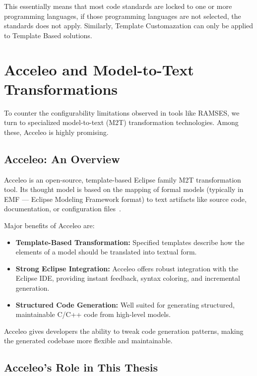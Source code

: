 This essentially means that most code standards are locked to one or more programming languages, if those programming languages are not selected, the standards does not apply. Similarly, Template Customazation can only be applied to Template Based solutions.

\section{Acceleo and Model-to-Text Transformations} \label{sec:folders_and_files}

To counter the configurability limitations observed in tools like RAMSES, we turn to specialized model-to-text (M2T) transformation technologies. Among these, Acceleo is highly promising.

\subsection*{Acceleo: An Overview}

Acceleo is an open-source, template-based Eclipse family M2T transformation tool. Its thought model is based on the mapping of formal models (typically in EMF — Eclipse Modeling Framework format) to text artifacts like source code, documentation, or configuration files~\cite{AcceleoUserGuide}.

Major benefits of Acceleo are: 
\begin{itemize} 
	\item \textbf{Template-Based Transformation:} Specified templates describe how the elements of a model should be translated into textual form.
	\item \textbf{Strong Eclipse Integration:} Acceleo offers robust integration with the Eclipse IDE, providing instant feedback, syntax coloring, and incremental generation.
	\item \textbf{Structured Code Generation:} Well suited for generating structured, maintainable C/C++ code from high-level models.
\end{itemize}

\begin{tcolorbox}[colback=blue!5, colframe=blue!40!black] Acceleo gives developers the ability to tweak code generation patterns, making the generated codebase more flexible and maintainable. \end{tcolorbox}

\subsection*{Acceleo’s Role in This Thesis}

